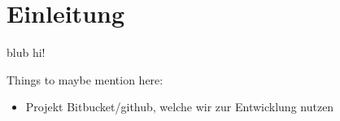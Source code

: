 \section{Einleitung}\label{sec:einleitung}

blub hi!

Things to maybe mention here:

\begin{itemize}
	\item \visit Projekt Bitbucket/github, welche wir zur Entwicklung nutzen
\end{itemize}